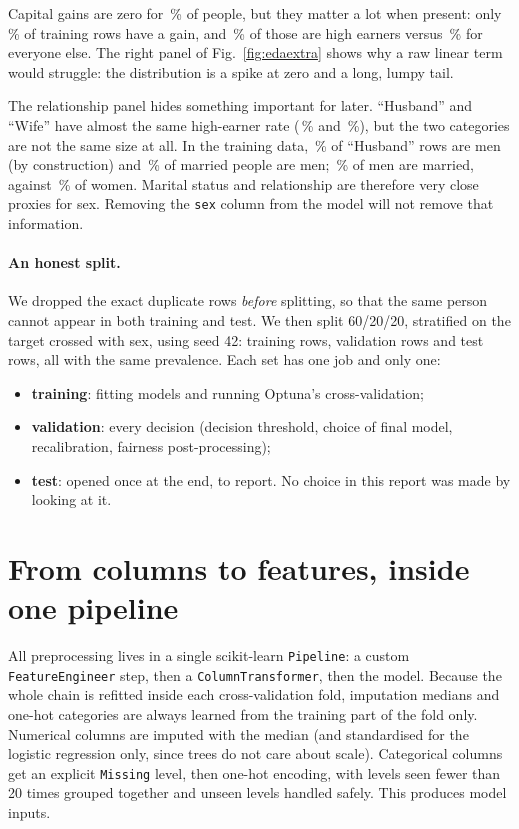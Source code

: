 \documentclass[11pt,a4paper]{article}
\begin{document}
Capital gains are zero for \CapZero\,\% of people, but they matter a lot when present: only \XCapGainShare\,\% of training rows have a gain, and \XCapGainPosRate\,\% of those are high earners versus \XCapGainZeroPosRate\,\% for everyone else. The right panel of Fig.~\ref{fig:edaextra} shows why a raw linear term would struggle: the distribution is a spike at zero and a long, lumpy tail.

The relationship panel hides something important for later. ``Husband'' and ``Wife'' have almost the same high-earner rate (\XRelHusbandRate\,\% and \XRelWifeRate\,\%), but the two categories are not the same size at all. In the training data, \XHusbandMaleShare\,\% of ``Husband'' rows are men (by construction) and \XMarriedMaleShare\,\% of married people are men; \XMaleMarriedRate\,\% of men are married, against \XFemaleMarriedRate\,\% of women. Marital status and relationship are therefore very close proxies for sex. Removing the \texttt{sex} column from the model will not remove that information.

\paragraph{An honest split.} We dropped the \NDup{} exact duplicate rows \emph{before} splitting, so that the same person cannot appear in both training and test. We then split 60/20/20, stratified on the target crossed with sex, using seed 42: \NTrain{} training rows, \NVal{} validation rows and \NTest{} test rows, all with the same prevalence. Each set has one job and only one:
\begin{itemize}
\item \textbf{training}: fitting models and running Optuna's cross-validation;
\item \textbf{validation}: every decision (decision threshold, choice of final model, recalibration, fairness post-processing);
\item \textbf{test}: opened once at the end, to report. No choice in this report was made by looking at it.
\end{itemize}

\section{From columns to features, inside one pipeline}\label{sec:fe}
All preprocessing lives in a single scikit-learn \texttt{Pipeline}: a custom \texttt{FeatureEngineer} step, then a \texttt{ColumnTransformer}, then the model. Because the whole chain is refitted inside each cross-validation fold, imputation medians and one-hot categories are always learned from the training part of the fold only. Numerical columns are imputed with the median (and standardised for the logistic regression only, since trees do not care about scale). Categorical columns get an explicit \texttt{Missing} level, then one-hot encoding, with levels seen fewer than 20 times grouped together and unseen levels handled safely. This produces \NCols{} model inputs.
\end{document}

